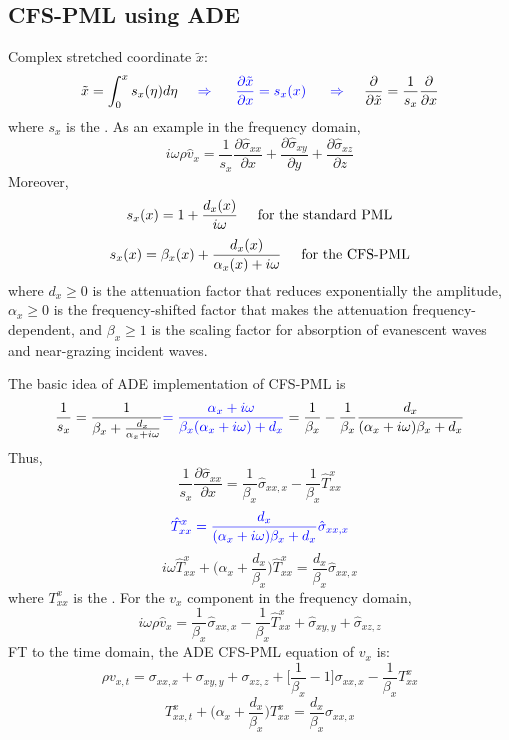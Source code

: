 \subsection{CFS-PML using ADE}
Complex stretched coordinate $\tilde x$:
\[ \tilde x=\int_0^xs_x(\eta)d\eta {\color{blue} \hspace{5mm}\Rightarrow\hspace{5mm} \frac{\partial\tilde x}{\partial x}=s_x(x) \hspace{5mm}\Rightarrow\hspace{5mm} } \frac{\partial}{\partial\tilde x}=\frac{1}{s_x}\frac{\partial}{\partial x} \]
where $s_x$ is the . As an example in the frequency domain,
\[ i\omega\rho\hat v_x=\frac{1}{s_x}\frac{\partial\hat\sigma_{xx}}{\partial x}+\frac{\partial\hat\sigma_{xy}}{\partial y}+\frac{\partial\hat\sigma_{xz}}{\partial z} \]
Moreover,
\[ s_x(x)=1+\frac{d_x(x)}{i\omega} \hspace{5mm}\text{for the standard PML} \]
\[ s_x(x)=\beta_x(x)+\frac{d_x(x)}{\alpha_x(x)+i\omega} \hspace{5mm}\text{for the CFS-PML} \]
where $d_x\geqslant 0$ is the attenuation factor that reduces exponentially the amplitude, $\alpha_x\geqslant 0$ is the frequency-shifted factor that makes the attenuation frequency-dependent, and $\beta_x\geqslant 1$ is the scaling factor for absorption of evanescent waves and near-grazing incident waves.\par
The basic idea of ADE implementation of CFS-PML is
\[ \frac{1}{s_x}=\frac{1}{\beta_x+\frac{d_x}{\alpha_x+i\omega}} {\color{blue}=\frac{\alpha_x+i\omega}{\beta_x(\alpha_x+i\omega)+d_x}} =\frac{1}{\beta_x}-\frac{1}{\beta_x}\frac{d_x}{(\alpha_x+i\omega)\beta_x+d_x} \]
Thus,
\[ \frac{1}{s_x}\frac{\partial\hat\sigma_{xx}}{\partial x}=\frac{1}{\beta_x}\hat\sigma_{xx,x}-\frac{1}{\beta_x}\hat T_{xx}^x \]
\[ {\color{blue} \hat T_{xx}^x=\frac{d_x}{(\alpha_x+i\omega)\beta_x+d_x}\hat\sigma_{xx,x} } \]
\[ i\omega\hat T_{xx}^x+\Big(\alpha_x+\frac{d_x}{\beta_x}\Big)\hat T_{xx}^x=\frac{d_x}{\beta_x}\hat\sigma_{xx,x} \]
where $T_{xx}^x$ is the . For the $v_x$ component in the frequency domain,
\[ i\omega\rho\hat v_x=\frac{1}{\beta_x}\hat\sigma_{xx,x}-\frac{1}{\beta_x}\hat T_{xx}^x+\hat\sigma_{xy,y}+\hat\sigma_{xz,z} \]
FT to the time domain, the ADE CFS-PML equation of $v_x$ is:
\[ \rho v_{x,t}=\sigma_{xx,x}+\sigma_{xy,y}+\sigma_{xz,z}+\Big[\frac{1}{\beta_x}-1\Big]\sigma_{xx,x}-\frac{1}{\beta_x}T_{xx}^x \]
\[ T_{xx,t}^x+\Big(\alpha_x+\frac{d_x}{\beta_x}\Big)T_{xx}^x=\frac{d_x}{\beta_x}\sigma_{xx,x} \]
